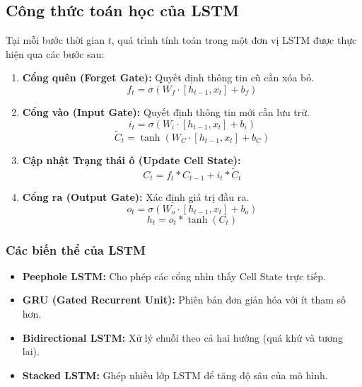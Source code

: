 \subsection{Công thức toán học của LSTM}
Tại mỗi bước thời gian $t$, quá trình tính toán trong một đơn vị LSTM được thực hiện qua các bước sau:

\begin{enumerate}
    \item \textbf{Cổng quên (Forget Gate):} Quyết định thông tin cũ cần xóa bỏ.
    \begin{equation}
        f_t = \sigma(W_f \cdot [h_{t-1}, x_t] + b_f)
    \end{equation}
    
    \item \textbf{Cổng vào (Input Gate):} Quyết định thông tin mới cần lưu trữ.
    \begin{equation}
        i_t = \sigma(W_i \cdot [h_{t-1}, x_t] + b_i)
    \end{equation}
    \begin{equation}
        \tilde{C}_t = \tanh(W_C \cdot [h_{t-1}, x_t] + b_C)
    \end{equation}
    
    \item \textbf{Cập nhật Trạng thái ô (Update Cell State):}
    \begin{equation}
        C_t = f_t * C_{t-1} + i_t * \tilde{C}_t
    \end{equation}
    
    \item \textbf{Cổng ra (Output Gate):} Xác định giá trị đầu ra.
    \begin{equation}
        o_t = \sigma(W_o \cdot [h_{t-1}, x_t] + b_o)
    \end{equation}
    \begin{equation}
        h_t = o_t * \tanh(C_t)
    \end{equation}
\end{enumerate}

\subsubsection{Các biến thể của LSTM}
\begin{itemize}
    \item \textbf{Peephole LSTM:} Cho phép các cổng nhìn thấy Cell State trực tiếp.
    \item \textbf{GRU (Gated Recurrent Unit):} Phiên bản đơn giản hóa với ít tham số hơn.
    \item \textbf{Bidirectional LSTM:} Xử lý chuỗi theo cả hai hướng (quá khứ và tương lai).
    \item \textbf{Stacked LSTM:} Ghép nhiều lớp LSTM để tăng độ sâu của mô hình.
\end{itemize}

